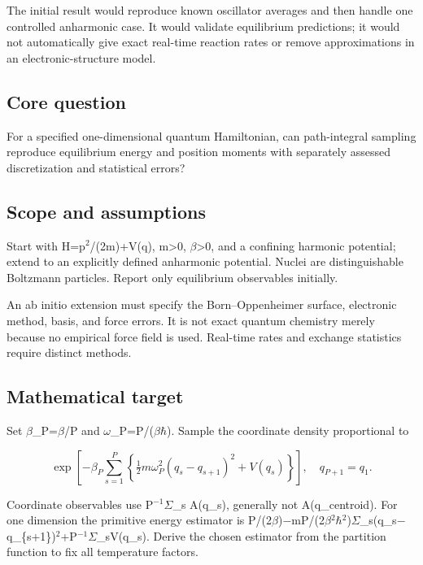 \documentclass[
  11pt,
]{article}
\begin{document}
The initial result would reproduce known oscillator averages and then
handle one controlled anharmonic case. It would validate equilibrium
predictions; it would not automatically give exact real-time reaction
rates or remove approximations in an electronic-structure model.

\subsection{Core question}

For a specified one-dimensional quantum Hamiltonian, can path-integral
sampling reproduce equilibrium energy and position moments with
separately assessed discretization and statistical errors?

\subsection{Scope and assumptions}

Start with H=p\ensuremath{{}^{2}}/(2m)+V(q), m\textgreater0,
\ensuremath{\beta}>0, and a confining harmonic potential; extend to an
explicitly defined anharmonic potential. Nuclei are distinguishable
Boltzmann particles. Report only equilibrium observables initially.

An ab initio extension must specify the Born--Oppenheimer surface,
electronic method, basis, and force errors. It is not exact quantum
chemistry merely because no empirical force field is used. Real-time
rates and exchange statistics require distinct methods.

\subsection{Mathematical target}

Set \ensuremath{\beta}\_P=\ensuremath{\beta}/P and
\ensuremath{\omega}\_P=P/(\ensuremath{\beta}\ensuremath{\hbar}). Sample
the coordinate density proportional to

\[\exp\left[-\beta _P\sum_{s=1}^P\left\{\tfrac12m\omega _P^{2}(q_s-q_{s+1})^{2}+V(q_s)\right\}\right],\quad q_{P+1}=q_1.\]

Coordinate observables use P\ensuremath{{}^{-1}}\ensuremath{\Sigma}\_s
A(q\_s), generally not A(q\_centroid). For one dimension the primitive
energy estimator is
P/(2\ensuremath{\beta})\ensuremath{-}mP/(2\ensuremath{\beta}\ensuremath{{}^{2}}\ensuremath{\hbar}\ensuremath{{}^{2}})\ensuremath{\Sigma}\_s(q\_s\ensuremath{-}q\_\{s+1\})\ensuremath{{}^{2}}+P\ensuremath{{}^{-1}}\ensuremath{\Sigma}\_sV(q\_s).
Derive the chosen estimator from the partition function to fix all
temperature factors.
\end{document}
